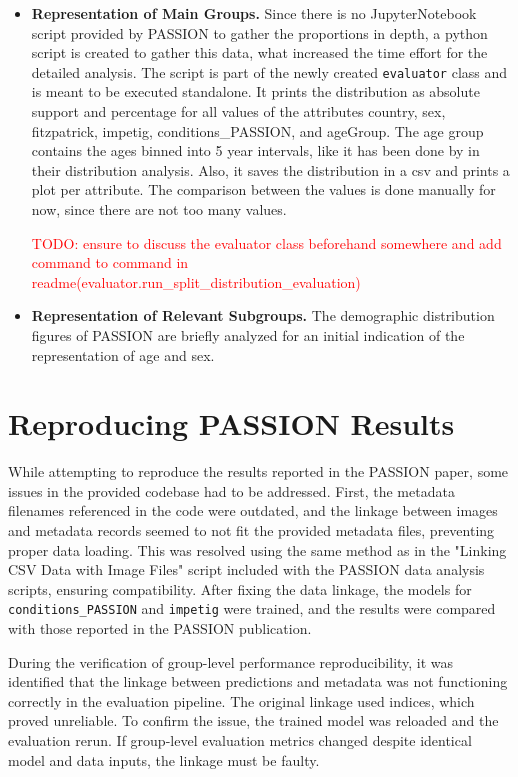 \documentclass[12pt, a4paper, oneside]{book}   	%
\renewcommand{\todo}[1]{\textcolor{red}{TODO: #1}}
\begin{document}
\begin{itemize}
			\item \textbf{Representation of Main Groups.}
			Since there is no \gls{JupyterNotebook} script provided by PASSION to gather the proportions in depth, a python script is created to gather this data, what increased the time effort for the detailed analysis. The script is part of the newly created \texttt{evaluator} class and is meant to be executed standalone.
			It prints the distribution as absolute support and percentage for all values of the attributes country, sex, fitzpatrick, impetig, conditions\_PASSION, and ageGroup. The age group contains the ages binned into 5 year intervals, like it has been done by \textcite{Gottfrois2024} in their distribution analysis.
			Also, it saves the distribution in a csv and prints a plot per attribute. The comparison between the values is done manually for now, since there are not too many values.
			
			\todo{ensure to discuss the evaluator class beforehand somewhere and add command to command in readme(evaluator.run\_split\_distribution\_evaluation)} 
			
			\item \textbf{Representation of Relevant Subgroups.} The demographic distribution figures of PASSION are briefly analyzed for an initial indication of the representation of age and sex.
		\end{itemize}
		
		
		\section{Reproducing PASSION Results}
		While attempting to reproduce the results reported in the PASSION paper, some issues in the provided codebase had to be addressed. First, the metadata filenames referenced in the code were outdated, and the linkage between images and metadata records seemed to not fit the provided metadata files, preventing proper data loading. This was resolved using the same method as in the "Linking CSV Data with Image Files" script included with the PASSION data analysis scripts, ensuring compatibility. After fixing the data linkage, the models for \texttt{conditions\_PASSION} and \texttt{impetig} were trained, and the results were compared with those reported in the PASSION publication.
		
		During the verification of group-level performance reproducibility, it was identified that the linkage between predictions and metadata was not functioning correctly in the evaluation pipeline. The original linkage used indices, which proved unreliable. To confirm the issue, the trained model was reloaded and the evaluation rerun. If group-level evaluation metrics changed despite identical model and data inputs, the linkage must be faulty.
		
\end{document}
